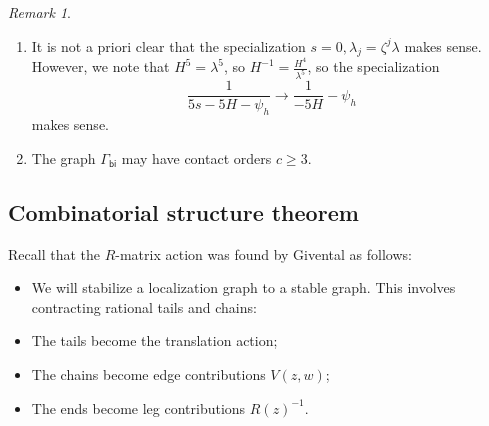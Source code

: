 \documentclass[10pt]{amsart}
\theoremstyle{definition}
\theoremstyle{remark}
\newtheorem{rmk}[thm]{Remark}
\theoremstyle{plain}
\theoremstyle{definition}
\theoremstyle{remark}
\newcommand{\ms}[1]{\mathsf{#1}}
\newcommand{\1}{\mathbf{1}}
\newcommand{\2}{\mathbf{2}}
\newcommand{\3}{\mathbf{3}}
\begin{document}
\begin{rmk}\leavevmode
    \begin{enumerate}
        \item It is not a priori clear that the specialization $s=0, \lambda_j = \zeta^j \lambda$ makes sense. However, we note that $H^5 = \lambda^5$, so $H^{-1} = \frac{H^4}{\lambda^5}$, so the specialization
            \[ \frac{1}{5s - 5H - \psi_h} \to \frac{1}{-5H} - \psi_h \]
            makes sense.
        \item The graph $\Gamma_{\ms{bi}}$ may have contact orders $c \geq 3$.
    \end{enumerate}
\end{rmk}

\subsection{Combinatorial structure theorem}%
\label{sub:Combinatorial structure theorem}

Recall that the $R$-matrix action was found by Givental as follows:
\begin{itemize}
    \item We will stabilize a localization graph to a stable graph. This involves contracting rational tails and chains:
    \item The tails become the translation action;
    \item The chains become edge contributions $V(z,w)$;
    \item The ends become leg contributions $R(z)^{-1}$.
\end{itemize}
\end{document}
